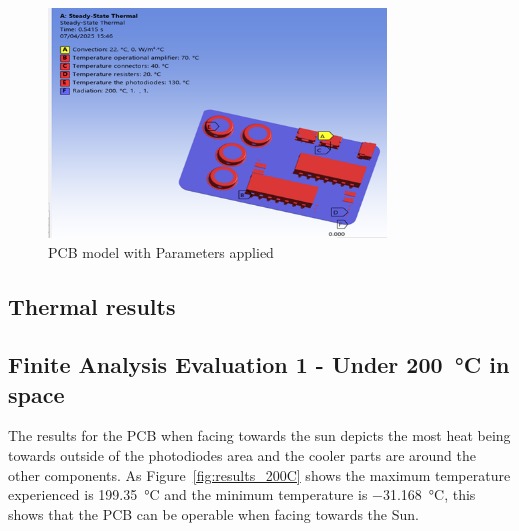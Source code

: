 \begin{figure}[H]
    \centering
    \includegraphics[width=0.8\textwidth]{chapters/methodology/ThermalAnalysis/Fig1parameters.png}
    \caption{PCB model with Parameters applied}
    \label{fig:PCBparameters}
\end{figure}

\subsection{Thermal results}

\subsection{Finite Analysis Evaluation 1 - Under \SI{200}{\celsius} in space}

The results for the PCB when facing towards the sun
depicts the most heat being towards outside of the photodiodes area and
the cooler parts are around the other components. As Figure~\ref{fig:results_200C} 
shows the maximum temperature experienced is \SI{199.35}{\celsius} and the minimum
temperature is \SI{-31.168}{\celsius}, this shows that the PCB can be operable when
facing towards the Sun.

